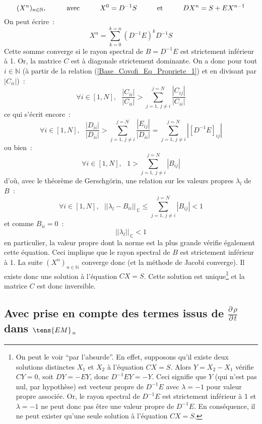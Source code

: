 $$(X^n)_{n\in\mathbb{N}}, \text{\hspace*{1cm}avec\hspace*{1cm}} X^0=D^{-1}S
\text{\hspace*{1cm}et\hspace*{1cm}} DX^n=S+EX^{n-1}$$
On peut écrire~:
$$X^n = \sum\limits_{k=0}^{k=n} \left(D^{-1}E\right)^k D^{-1}S$$
Cette somme converge si
le rayon spectral de $B=D^{-1}E$ est strictement inférieur à 1. Or, la
matrice $C$ est à diagonale strictement dominante. On a donc pour tout $i\in\mathbb{N}$
(à partir de la relation (\ref{Base_Covofi_Eq_Propriete_1}) et en
divisant par $|C_{ii}|$)~:
$$\forall i \in [1,N],\ \ \ \frac{|C_{ii}|}{|C_{ii}|} > \sum\limits_{j=1,\,j\neq
i}^{j=N}\frac{|C_{ij}|}{|C_{ii}|}$$ ce qui s'écrit encore~:
$$\forall i \in [1,N],\ \ \ \frac{|D_{ii}|}{|D_{ii}|} > \sum\limits_{j=1,\,j\neq
i}^{j=N}\frac{|E_{ij}|}{|D_{ii}|}=\sum\limits_{j=1,\,j\neq
i}^{j=N}|\left[D^{-1}E\right]_{ij}|$$ ou bien~:
$$\forall i \in [1,N],\ \ \  1 > \sum\limits_{j=1,\,j\neq
i}^{j=N}|B_{ij}|$$  d'où, avec le théorème de Gerschg\"orin, une
relation sur les valeurs propres $\lambda_l$ de $B$~:
$$\forall i \in [1,N],\ \ \  ||\lambda_l - B_{ii}||_{\,\mathbb{C}} \leqslant \sum\limits_{j=1,\,j\neq i}^{j=N}|B_{ij}| < 1 $$
et comme $B_{ii}=0$~:
$$ ||\lambda_l ||_{\,\mathbb{C}}  < 1 $$
en particulier, la valeur propre dont la norme est la plus grande vérifie
également cette
équation. Ceci implique que le rayon spectral de $B$ est strictement
inférieur à 1. La suite $(X^n)_{n\in\mathbb{N}}$ converge donc (et la méthode
de Jacobi converge). Il existe donc une solution à l'équation  $CX=S$. Cette
solution est unique\footnote{On peut le voir ``par l'absurde''.
En effet, supposons qu'il existe deux solutions
distinctes $X_1$ et $X_2$ à l'équation  $CX=S$. Alors $Y=X_2-X_1$ vérifie
$CY=0$, soit $DY=-EY$, donc $D^{-1}EY=-Y$. Ceci signifie que $Y$
(qui n'est pas nul, par
hypothèse) est vecteur propre de $D^{-1}E$ avec $\lambda=-1$ pour valeur
propre associée. Or, le rayon spectral de $D^{-1}E$ est strictement
inférieur à 1 et $\lambda=-1$ ne peut donc pas être une valeur propre de
$D^{-1}E$.  En conséquence, il ne peut exister qu'une seule solution
à l'équation  $CX=S$.} et la matrice $C$ est donc inversible.


\subsection*{Avec prise en compte des termes issus de
$\displaystyle \frac{{\partial}\,\rho}{{\partial}\,t}$ dans  $\tens{EM}_{\,n}$}
\label{Base_Covofi_Avecdrhodt}
